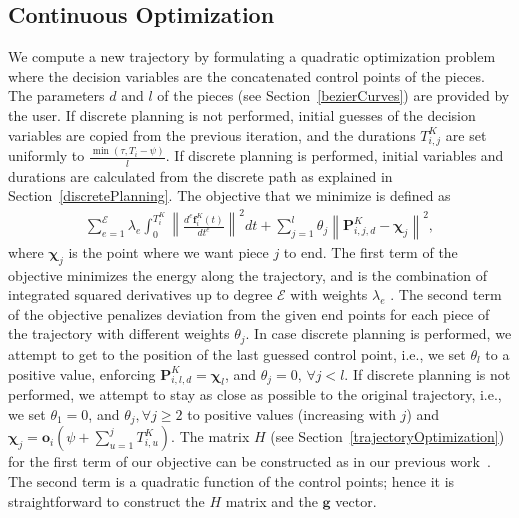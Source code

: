 \documentclass{svproc}
\newcommand{\vP}{\mathbf{P}}
\newcommand{\vg}{\mathbf{g}}
\newcommand{\vf}{\mathbf{f}}
\newcommand{\vo}{\mathbf{o}}
\newcommand{\vchi}{\mathbf{\chi}}
\newcommand{\cE}{\mathcal{E}}
\begin{document}
\subsection{Continuous Optimization}\label{continuousOptimization}
We compute a new trajectory by formulating a quadratic optimization problem where the decision variables are the concatenated control points of the pieces.
The parameters $d$ and $l$ of the pieces (see Section~\ref{bezierCurves}) are provided by the user.
If discrete planning is not performed, initial guesses of the decision variables are copied from the previous iteration, and the durations $T^{K}_{i,j}$ are set uniformly to $\frac{\min(\tau,T_i-\psi)}{l}$.
If discrete planning is performed, initial variables and durations are calculated from the discrete path as explained in Section~\ref{discretePlanning}.
The objective that we minimize is defined as
\begin{align}
    \sum_{e=1}^{\cE} \lambda_e\int_{0}^{T^K_i} \left\|\frac{d^e\vf^{K}_i(t)}{dt^e}\right\|^2dt + \sum_{j=1}^{l} \theta_j \left\|\vP^{K}_{i,j,d} - \vchi_{j}\right\|^2, \label{costFunction}
\end{align}
where $\vchi_j$ is the point  where we want piece $j$ to end.
The first term of the objective minimizes the energy along the trajectory, and is the combination of integrated squared derivatives up to degree $\cE$ with weights $\lambda_e$ \cite{crazyplanning-ieeetro}. %
The second term of the objective penalizes deviation from the given end points for each piece of the trajectory with different weights $\theta_j$.
In case discrete planning is performed, we attempt to get to the position of the last guessed control point, i.e., we set $\theta_l$ to a positive value, enforcing $\vP^K_{i,l,d} = \vchi_l$, and $\theta_j = 0,\,\forall j < l$.
If discrete planning is not performed, we attempt to stay as close as possible to the original trajectory, i.e.,  we set $\theta_1 = 0$, and $\theta_j, \forall j \geq 2$ to positive values (increasing with $j$) and $\vchi_j = \vo_i(\psi + \sum_{u=1}^j T^{K}_{i,u})$.
The matrix $H$ (see Section~\ref{trajectoryOptimization}) for the first term of our objective can be constructed as in our previous work~\cite{crazyplanning-ieeetro}.
The second term is a quadratic function of the control points; hence it is straightforward to construct the $H$ matrix and the $\vg$ vector.
\end{document}
